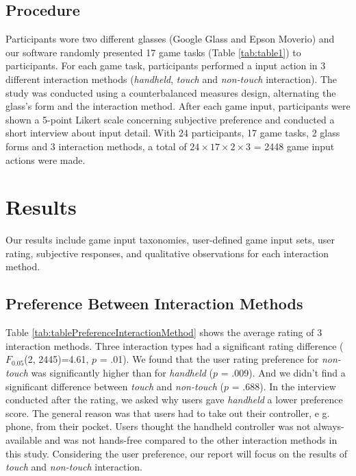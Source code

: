 \documentclass{sigchi}
\begin{document}
  

    \subsection {Procedure}
    Participants wore two different glasses (Google Glass and Epson Moverio) and our software randomly presented 17 game tasks (Table \ref{tab:table1}) to participants. For each game task, participants performed a input action in 3 different interaction methods (\emph{handheld}, \emph{touch} and \emph{non-touch} interaction). The study was conducted using a counterbalanced measures design, alternating the glass's form and the interaction method. After each game input, participants were shown a 5-point Likert scale concerning subjective preference and conducted a short interview about input detail. With 24 participants, 17 game tasks, 2 glass forms and 3 interaction methods, a total of $24 \times 17 \times 2 \times 3$ = 2448 game input actions were made. 


\section{Results}

Our results include game input taxonomies, user-defined game input sets, user rating, subjective responses, and qualitative observations for each interaction method.

  \subsection{Preference Between Interaction Methods}
  Table \ref{tab:tablePreferenceInteractionMethod} shows the average rating of 3 interaction methods. Three interaction types had a significant rating difference ($F_{0.05}$(2, 2445)=4.61, $p$ = .01). We found that the user rating preference for \emph{non-touch} was significantly higher than for \emph{handheld} ($p$ = .009). And we didn't find a significant difference between \emph{touch} and \emph{non-touch} ($p$ = .688).
  In the interview conducted after the rating, we asked why users gave \emph{handheld} a lower preference score.
  The general reason was that users had to take out their controller, e g. phone, from their pocket. Users thought the handheld controller was not always-available and was not hands-free compared to the other interaction methods in this study. Considering the user preference, our report will focus on the results of \emph{touch} and \emph{non-touch} interaction.
\end{document}
